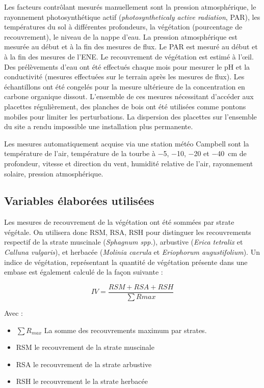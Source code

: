 Les facteurs contrôlant mesurés manuellement sont la pression atmosphérique, le rayonnement photosynthétique actif (\textit{photosyntheticaly active radiation}, PAR), les températures du sol à différentes profondeurs, la végétation (pourcentage de recouvrement), le niveau de la nappe d'eau.
La pression atmosphérique est mesurée au début et à la fin des mesures de flux.
Le PAR est mesuré au début et à la fin des mesures de l'ENE.
Le recouvrement de végétation est estimé à l’œil.
Des prélèvements d'eau ont été effectués chaque mois pour mesurer le pH et la conductivité (mesures effectuées sur le terrain après les mesures de flux).
Les échantillons ont été congelés pour la mesure ultérieure de la concentration en carbone organique dissout.
L'ensemble de ces mesures nécessitant d'accéder aux placettes régulièrement, des planches de bois ont été utilisées comme pontons mobiles pour limiter les perturbations. La dispersion des placettes sur l'ensemble du site a rendu impossible une installation plus permanente.

Les mesures automatiquement acquise via une station météo Campbell\textsuperscript{\textregistered} sont la température de l'air, température de la tourbe à \num{-5}, \num{-10}, \num{-20} et \SI{-40}{\centi\metre} de profondeur, vitesse et direction du vent, humidité relative de l'air, rayonnement solaire, pression atmosphérique.

\subsection{Variables élaborées utilisées}

Les mesures de recouvrement de la végétation ont été sommées par strate végétale.
On utilisera donc RSM, RSA, RSH pour distinguer les recouvrements respectif de la strate muscinale (\textit{Sphagnum spp.}), arbustive (\textit{Erica tetralix} et \textit{Calluna vulgaris}), et herbacée (\textit{Molinia caerula} et \textit{Eriophorum augustifolium}).
Un indice de végétation, représentant la quantité de végétation présente dans une embase est également calculé de la façon suivante : 

\begin{equation}
IV = \frac{RSM + RSA + RSH}{\sum R{max}}
\end{equation}

Avec :
\begin{itemize}
\item $\sum R_{max}$ La somme des recouvrements maximum par strates.
\item RSM le recouvrement de la strate muscinale
\item RSA le recouvrement de la strate arbustive
\item RSH le recouvrement le la strate herbacée
\end{itemize}

